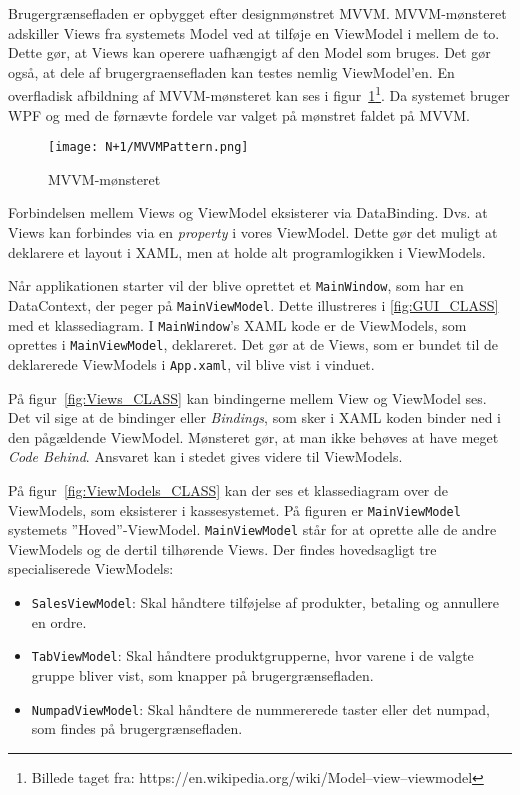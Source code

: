 Brugergrænsefladen er opbygget efter designmønstret \gls{MVVM}. \gls{MVVM}-mønsteret adskiller \gls{View}s fra systemets \gls{Model} ved at tilføje en \gls{ViewModel} i mellem de to. Dette gør, at \gls{View}s kan operere uafhængigt af den \gls{Model} som bruges. Det gør også, at dele af \gls{brugergraenseflade}n kan testes nemlig \gls{ViewModel}'en. En overfladisk afbildning af \gls{MVVM}-mønsteret kan ses i figur~\ref{fig:MVVM}\footnote{Billede taget fra: https://en.wikipedia.org/wiki/Model–view–viewmodel}. Da systemet bruger \gls{WPF} og med de førnævte fordele var valget på mønstret faldet på \gls{MVVM}.

\begin{figure}[H]
\centering
\texttt{[image: N+1/MVVMPattern.png]}
\caption{MVVM-mønsteret}
\label{fig:MVVM}
\end{figure}

Forbindelsen mellem \gls{View}s og \gls{ViewModel} eksisterer via DataBinding. Dvs. at \gls{View}s kan forbindes via en \textit{property} i vores \gls{ViewModel}. Dette gør det muligt at deklarere et layout i \gls{XAML}, men at holde alt programlogikken i \gls{ViewModel}s.


Når applikationen starter vil der blive oprettet et \texttt{MainWindow}, som har en DataContext, der peger på \texttt{MainViewModel}. Dette illustreres i \ref{fig:GUI_CLASS} med et klassediagram. I \texttt{MainWindow}'s \gls{XAML} kode er de \gls{ViewModel}s, som oprettes i \texttt{MainViewModel}, deklareret. Det gør at de \gls{View}s, som er bundet til de deklarerede \gls{ViewModel}s i \texttt{App.xaml}, vil blive vist i vinduet.


På figur~\ref{fig:Views_CLASS} kan bindingerne mellem \gls{View} og \gls{ViewModel} ses. Det vil sige at de bindinger eller \textit{Bindings}, som sker i \gls{XAML} koden binder ned i den pågældende \gls{ViewModel}. Mønsteret gør, at man ikke behøves at have meget \textit{Code Behind}. Ansvaret kan i stedet gives videre til \gls{ViewModel}s.


På figur~\ref{fig:ViewModels_CLASS} kan der ses et klassediagram over de \gls{ViewModel}s, som eksisterer i kassesystemet. På figuren er \texttt{MainViewModel} systemets ''Hoved''-\gls{ViewModel}. \texttt{MainViewModel} står for at oprette alle de andre \gls{ViewModel}s og de dertil tilhørende \gls{View}s. Der findes hovedsagligt tre specialiserede \gls{ViewModel}s:
\begin{itemize}
	\item \texttt{SalesViewModel}: Skal håndtere tilføjelse af produkter, betaling og annullere en ordre.
	\item \texttt{TabViewModel}: Skal håndtere produktgrupperne, hvor varene i de valgte gruppe bliver vist, som knapper på brugergrænsefladen.
	\item \texttt{NumpadViewModel}: Skal håndtere de nummererede taster eller det numpad, som findes på brugergrænsefladen.
\end{itemize}

